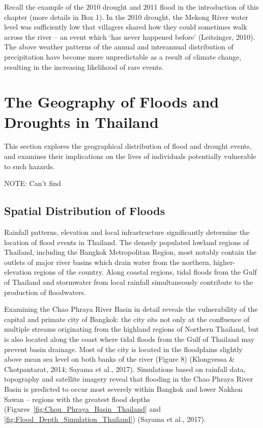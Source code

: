 Recall the example of the 2010 drought and 2011 flood in the introduction of this chapter (more details in Box 1). In the 2010 drought, the Mekong River water level was sufficiently low that villagers shared how they could sometimes walk across the river -- an event which ‘has never happened before' (Leitsinger, 2010). The above weather patterns of the annual and interannual distribution of precipitation have become more unpredictable as a result of climate change, resulting in the increasing likelihood of rare events.


\section{The Geography of Floods and Droughts in Thailand}

This section explores the geographical distribution of flood and drought events, and examines their implications on the lives of individuals potentially vulnerable to such hazards.

NOTE: Can't find \citet{dasgupta2009sea}

\subsection{Spatial Distribution of Floods}

Rainfall patterns, elevation and local infrastructure significantly determine the location of flood events in Thailand. The densely populated lowland regions of Thailand, including the Bangkok Metropolitan Region, most notably contain the outlets of major river basins which drain water from the northern, higher-elevation regions of the country. Along coastal regions, tidal floods from the Gulf of Thailand and stormwater from local rainfall simultaneously contribute to the production of floodwaters.

Examining the Chao Phraya River Basin in detail reveals the vulnerability of the capital and primate city of Bangkok: the city sits not only at the confluence of multiple streams originating from the highland regions of Northern Thailand, but is also located along the coast where tidal floods from the Gulf of Thailand may prevent basin drainage. Most of the city is located in the floodplains slightly above mean sea level on both banks of the river (Figure 8) (Klongvessa \& Chotpantarat, 2014; Sayama et al., 2017). Simulations based on rainfall data, topography and satellite imagery reveal that flooding in the Chao Phraya River Basin is predicted to occur most severely within Bangkok and lower Nakhon Sawan -- regions with the greatest flood depths (Figures~\ref{fig:Chou_Phraya_Basin_Thailand} and \ref{fig:Flood_Depth_Simulation_Thailand}) (Sayama et al., 2017).

